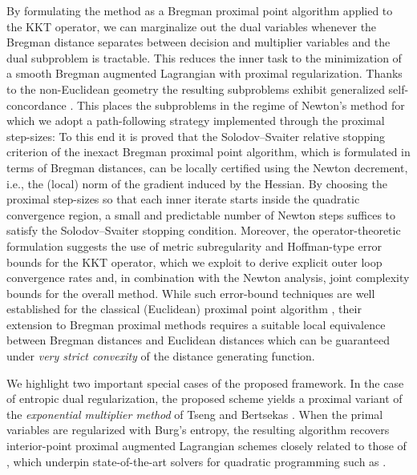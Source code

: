 \documentclass[11pt,onecolumn]{article}
\theoremstyle{remark}
\begin{document}
By formulating the method as a Bregman proximal point algorithm applied to the KKT operator, we can marginalize out the dual variables whenever the Bregman distance separates between decision and multiplier variables and the dual subproblem is tractable.
This reduces the inner task to the minimization of a smooth Bregman augmented Lagrangian with proximal regularization. Thanks to the non-Euclidean geometry the resulting subproblems exhibit generalized self-concordance \cite{nesterov1994interior,bach2010self,sun2019generalized,doikov2025minimizing}. This places the subproblems in the regime of Newton's method for which we adopt a path-following strategy implemented through the proximal step-sizes:
To this end it is proved that the Solodov--Svaiter relative stopping criterion of the inexact Bregman proximal point algorithm, which is formulated in terms of Bregman distances, can be locally certified using the Newton decrement, i.e., the (local) norm of the gradient induced by the Hessian.
By choosing the proximal step-sizes so that each inner iterate starts inside the quadratic convergence region, a small and predictable number of Newton steps suffices to satisfy the Solodov--Svaiter stopping condition. 
Moreover, the operator-theoretic formulation suggests the use of metric subregularity and Hoffman-type error bounds for the KKT operator, which we exploit to derive explicit outer loop convergence rates and, in combination with the Newton analysis, joint complexity bounds for the overall method.
While such error-bound techniques are well established for the classical (Euclidean) proximal point algorithm \cite{luque1984asymptotic,rockafellar2021advances}, their extension to Bregman proximal methods requires a suitable local equivalence between Bregman distances and Euclidean distances which can be guaranteed under \emph{very strict convexity} \cite{bauschke2000dykstras} of the distance generating function.

We highlight two important special cases of the proposed framework.
In the case of entropic dual regularization, the proposed scheme yields a proximal variant of the \emph{exponential multiplier method} of Tseng and Bertsekas \cite{tseng1993convergence}.
When the primal variables are regularized with Burg’s entropy, the resulting algorithm recovers interior-point proximal augmented Lagrangian schemes closely related to those of \cite{pougkakiotis2021interior,pougkakiotis2022interior}, which underpin state-of-the-art solvers for quadratic programming such as \cite{schwan2023piqp}.
\end{document}
